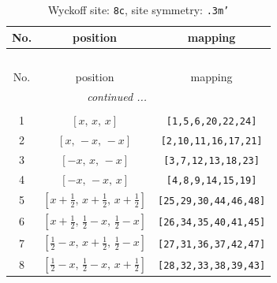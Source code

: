 \documentclass[fleqn,8pt]{jsarticle}
\begin{document}
\renewcommand{\arraystretch}{1.2}
\begin{longtable}{ccc}
\caption{Wyckoff site: {\tt 8c}, site symmetry: {\tt .3m'}}
 \\
 \hline \hline
No. & position & mapping \\ \hline \endfirsthead

\multicolumn{2}{l}{\tablename\ \thetable{}} \\
 \hline \hline
No. & position & mapping \\ \hline \endhead

 \hline \hline
\multicolumn{2}{r}{\footnotesize\it continued ...} \\ \endfoot

 \hline \hline
\multicolumn{2}{r}{} \\ \endlastfoot

1 & $\left[ x,\, x,\, x \right]$ & {\tt [1,5,6,20,22,24]} \\ \hline
2 & $\left[ x,\, - x,\, - x \right]$ & {\tt [2,10,11,16,17,21]} \\ \hline
3 & $\left[ - x,\, x,\, - x \right]$ & {\tt [3,7,12,13,18,23]} \\ \hline
4 & $\left[ - x,\, - x,\, x \right]$ & {\tt [4,8,9,14,15,19]} \\ \hline
5 & $\left[ x + \frac{1}{2},\, x + \frac{1}{2},\, x + \frac{1}{2} \right]$ & {\tt [25,29,30,44,46,48]} \\ \hline
6 & $\left[ x + \frac{1}{2},\, \frac{1}{2} - x,\, \frac{1}{2} - x \right]$ & {\tt [26,34,35,40,41,45]} \\ \hline
7 & $\left[ \frac{1}{2} - x,\, x + \frac{1}{2},\, \frac{1}{2} - x \right]$ & {\tt [27,31,36,37,42,47]} \\ \hline
8 & $\left[ \frac{1}{2} - x,\, \frac{1}{2} - x,\, x + \frac{1}{2} \right]$ & {\tt [28,32,33,38,39,43]} \\
\end{longtable}
\renewcommand{\arraystretch}{1.2}
\end{document}
